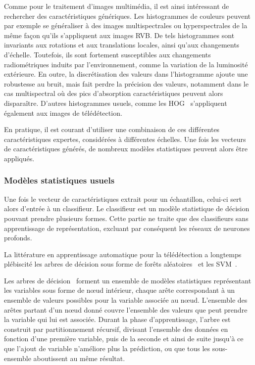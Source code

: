 Comme pour le traitement d'images multimédia, il est ainsi intéressant de rechercher des caractéristiques génériques. Les histogrammes de couleurs peuvent par exemple se généraliser à des images multispectrales ou hyperspectrales de la même façon qu'ils s'appliquent aux images \gls{RVB}. De tels histogrammes sont invariants aux rotations et aux translations locales, ainsi qu'aux changements d'échelle. Toutefois, ils sont fortement susceptibles aux changements radiométriques induits par l'environnement, comme la variation de la luminosité extérieure. En outre, la discrétisation des valeurs dans l'histogramme ajoute une robustesse au bruit, mais fait perdre la précision des valeurs, notamment dans le cas multispectral où des pics d'absorption caractéristiques peuvent alors disparaître. D'autres histogrammes usuels, comme les \gls{HOG}~\cite{dalal_histograms_2005} s'appliquent également aux images de télédétection.

En pratique, il est courant d'utiliser une combinaison de ces différentes caractéristiques expertes, considérées à différentes échelles. Une fois les vecteurs de caractéristiques générés, de nombreux modèles statistiques peuvent alors être appliqués.

\subsubsection{Modèles statistiques usuels}

Une fois le vecteur de caractéristiques extrait pour un échantillon, celui-ci sert alors d'entrée à un classifieur. Le classifieur est un modèle statistique de décision pouvant prendre plusieurs formes. Cette partie ne traite que des classifieurs sans apprentissage de représentation, excluant par conséquent les réseaux de neurones profonds.

La littérature en apprentissage automatique pour la télédétection a longtemps plébiscité les arbres de décision sous forme de forêts aléatoires~\cite{breiman_random_2001} et les \gls{SVM}~\cite{boser_training_1992,cortes_support-vector_1995}.

Les arbres de décision~\cite{breiman_classification_2017} forment un ensemble de modèles statistiques représentant les variables sous forme de n\oe{}ud intérieur, chaque arête correspondant à un ensemble de valeurs possibles pour la variable associée au n\oe{}ud. L'ensemble des arêtes partant d'un n\oe{}ud donné couvre l'ensemble des valeurs que peut prendre la variable qui lui est associée. Durant la phase d'apprentissage, l'arbre est construit par partitionnement récursif, divisant l'ensemble des données en fonction d'une première variable, puis de la seconde et ainsi de suite jusqu'à ce que l'ajout de variable n'améliore plus la prédiction, ou que tous les sous-ensemble aboutissent au même résultat.

